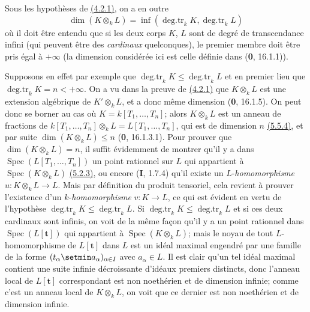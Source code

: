 \begin{remark}[4.2.1.4]
\label{IV.4.2.1.4}
Sous les hypothèses de {\hyperref[canon-index.ega4.c04.prop.4-2-1]{(4.2.1)}}, on a
en outre
\begin{equation}
 \dim(K\otimes_kL)=
 \inf(\operatorname{deg.tr}_kK,\operatorname{deg.tr}_kL)
 \label{IV.4.2.1.5}\tag{4.2.1.5}
\end{equation}
où il doit être entendu que si les deux corps $K$, $L$ sont de degré de
transcendance infini (qui peuvent être des \emph{cardinaux} quelconques), le
premier membre doit être pris égal à $+\infty$ (la dimension considérée
ici est celle définie dans (\textbf{0}, 16.1.1)).

Supposons en effet par exemple que
$\operatorname{deg.tr}_kK\leq\operatorname{deg.tr}_kL$ et en premier
lieu que $\operatorname{deg.tr}_kK=n<+\infty$. On a vu dans la preuve
de {\hyperref[canon-index.ega4.c04.prop.4-2-1]{(4.2.1)}} que $K\otimes_kL$ est une
extension algébrique de $K'\otimes_kL$, et a donc même dimension
(\textbf{0}, 16.1.5). On peut donc se borner au cas où
$K=k[T_1,\ldots,T_n]$; alors $K\otimes_kL$ est un anneau de fractions
de
$k[T_1,\ldots,T_n]\otimes_kL=L[T_1,\ldots,T_n]$,
qui est de dimension $n$ {\hyperref[canon-index.ega4.c04.cor.5-5-4]{(5.5.4)}}, et
par suite $\dim(K\otimes_kL)\leq n$ (\textbf{0}, 16.1.3.1). Pour prouver que
$\dim(K\otimes_kL)=n$, il suffit évidemment de montrer qu'il y a dans
$\operatorname{Spec}(L[T_1,\ldots,T_n])$ un point rationnel sur $L$
qui appartient à $\operatorname{Spec}(K\otimes_kL)$
{\hyperref[canon-index.ega4.c04.cor.5-2-3]{(5.2.3)}}, ou encore (\textbf{I}, 1.7.4) qu'il
existe un $L$-\emph{homomorphisme} $u:K\otimes_kL\to L$. Mais par définition
du produit tensoriel, cela revient à prouver l'existence d'un
$k$-\emph{homomorphisme} $v:K\to L$, ce qui est évident en vertu de
l'hypothèse
$\operatorname{deg.tr}_kK\leq\operatorname{deg.tr}_kL$.
Si $\operatorname{deg.tr}_kK\leq\operatorname{deg.tr}_kL$ et si ces
deux cardinaux sont infinis, on voit de la même façon qu'il y a un point
rationnel dans $\operatorname{Spec}(L[\mathbf{t}])$ qui
appartient à $\operatorname{Spec}(K\otimes_kL)$; mais le noyau de tout
$L$-homomorphisme de $L[\mathbf{t}]$ dans $L$ est un
idéal maximal engendré par une famille de la forme
$(t_\alpha\setmin a_\alpha)_{\alpha\in I}$ avec $a_\alpha\in L$. Il est clair
qu'un tel idéal maximal contient une suite infinie décroissante
d'idéaux premiers distincts, donc l'anneau local de
$L[\mathbf{t}]$ correspondant est non noethérien et de
dimension infinie; comme c'est un anneau local de $K\otimes_kL$, on
voit que ce dernier est non noethérien et de dimension infinie.
\end{remark}

